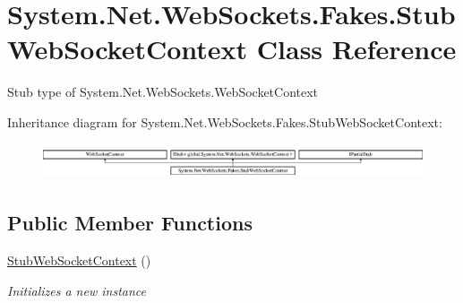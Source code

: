 \hypertarget{class_system_1_1_net_1_1_web_sockets_1_1_fakes_1_1_stub_web_socket_context}{\section{System.\-Net.\-Web\-Sockets.\-Fakes.\-Stub\-Web\-Socket\-Context Class Reference}
\label{class_system_1_1_net_1_1_web_sockets_1_1_fakes_1_1_stub_web_socket_context}
}


Stub type of System.\-Net.\-Web\-Sockets.\-Web\-Socket\-Context 


Inheritance diagram for System.\-Net.\-Web\-Sockets.\-Fakes.\-Stub\-Web\-Socket\-Context\-:\begin{figure}[H]
\begin{center}
\leavevmode
\includegraphics[height=1.051643cm]{class_system_1_1_net_1_1_web_sockets_1_1_fakes_1_1_stub_web_socket_context}
\end{center}
\end{figure}
\subsection*{Public Member Functions}
\begin{DoxyCompactItemize}
\item 
\hyperlink{class_system_1_1_net_1_1_web_sockets_1_1_fakes_1_1_stub_web_socket_context_ad3be300be971c6bee82be3397e1a189b}{Stub\-Web\-Socket\-Context} ()
\begin{DoxyCompactList}\small\item\em Initializes a new instance\end{DoxyCompactList}\end{DoxyCompactItemize}
